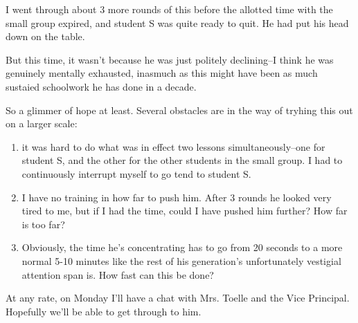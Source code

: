 \documentclass[11pt]{elegantbook}
\begin{document}
I went through about 3 more rounds of this before the allotted time
with the small group expired, and student S was quite ready to quit.
He had put his head down on the table.

But this time, it wasn't because he was just politely declining--I
think he was genuinely mentally exhausted, inasmuch as this might have
been as much sustaied schoolwork he has done in a decade.

So a glimmer of hope at least.  Several obstacles are in the way of
tryhing this out on a larger scale:
\begin{enumerate}
\item it was hard to do what was in effect two lessons simultaneously--one for student S, and the other for the other students in the small group.  I had to continuously interrupt myself to go tend to student S.
\item I have no training in how far to push him.  After 3 rounds he looked very tired to me, but if I had the time, could I have pushed him further?  How far is too far?
\item Obviously, the time he's concentrating has to go from 20 seconds to a more normal 5-10 minutes like the rest of his generation's unfortunately vestigial attention span is.  How fast can this be done?
\end{enumerate}
\noindent At any rate, on Monday I'll have a chat with Mrs. Toelle and the Vice Principal.  Hopefully we'll be able to get through to him.
\end{document}
